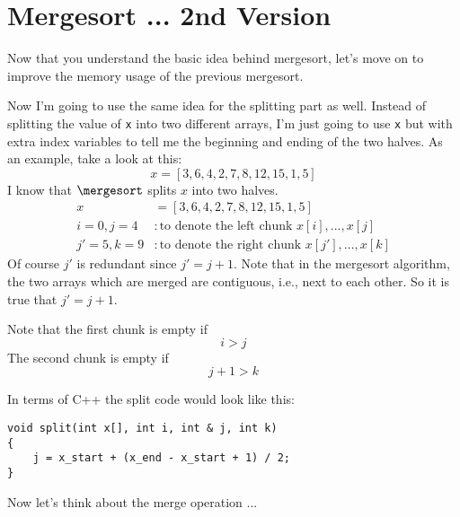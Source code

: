 \section{Mergesort ... 2nd Version}

Now that you understand the basic idea behind mergesort,
let's move on to improve the memory usage of the previous
mergesort.


Now I'm going to use the same idea for the splitting part as well.
Instead of splitting the value of \verb!x! into two different arrays,
I'm just going to use \verb!x! but with extra index variables to tell
me the beginning and ending of the two halves.
As an example, take a look at this:
\[
x = [3, 6, 4, 2, 7, 8, 12, 15, 1, 5]
\]
I know that $\mergesort$ splits $x$
into two halves.
\begin{align*}
x &= [3, 6, 4, 2, 7, 8, 12, 15, 1, 5] \\
i = 0, j = 4 &: \text{to denote the left chunk $x[i],...,x[j]$} \\
j' = 5, k = 9 &: \text{to denote the right chunk $x[j'],...,x[k]$}
\end{align*}
Of course $j'$ is redundant since $j' = j + 1$.
Note that in the mergesort algorithm, the two arrays which are merged
are contiguous, i.e., next to each other.
So it is true that $j' = j + 1$.

Note that the first chunk is empty if
\[
i > j
\]
The second chunk is empty if
\[
j + 1 > k
\]

In terms of C++ the split code would look like this:
\begin{Verbatim}[frame=single,fontsize=\footnotesize]
void split(int x[], int i, int & j, int k)
{
    j = x_start + (x_end - x_start + 1) / 2;
}
\end{Verbatim}


Now let's think about the merge operation ...


